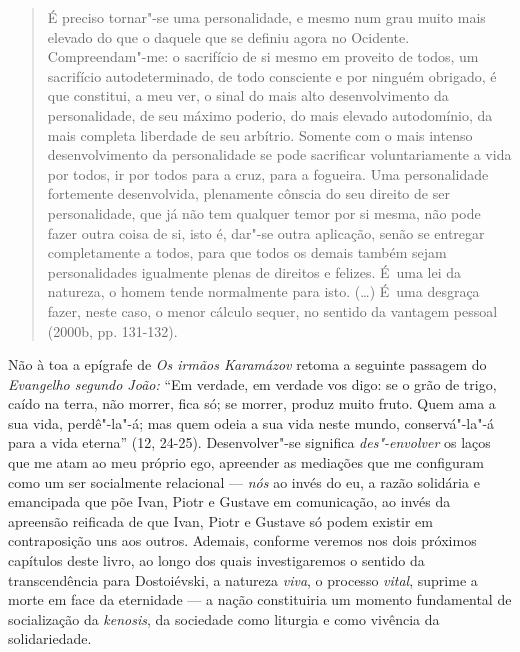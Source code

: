 \begin{quote}
É preciso tornar"-se uma personalidade, e mesmo num grau muito mais
elevado do que o daquele que se definiu agora no Ocidente.
Compreendam"-me: o sacrifício de si mesmo em proveito de todos, um
sacrifício autodeterminado, de todo consciente e por ninguém obrigado, é
que constitui, a meu ver, o sinal do mais alto desenvolvimento da
personalidade, de seu máximo poderio, do mais elevado autodomínio, da
mais completa liberdade de seu arbítrio. Somente com o mais intenso
desenvolvimento da personalidade se pode sacrificar voluntariamente a
vida por todos, ir por todos para a cruz, para a fogueira. Uma
personalidade fortemente desenvolvida, plenamente cônscia do seu direito
de ser personalidade, que já não tem qualquer temor por si mesma, não
pode fazer outra coisa de si, isto é, dar"-se outra aplicação, senão se
entregar completamente a todos, para que todos os demais também sejam
personalidades igualmente plenas de direitos e felizes. É~uma lei da
natureza, o homem tende normalmente para isto. (\ldots) É~uma desgraça
fazer, neste caso, o menor cálculo sequer, no sentido da vantagem
pessoal (2000b, pp. 131-132).
\end{quote}

Não à toa a epígrafe de \emph{Os irmãos Karamázov} retoma a seguinte
passagem do \emph{Evangelho segundo João:} ``Em verdade, em verdade vos
digo: se o grão de trigo, caído na terra, não morrer, fica só; se
morrer, produz muito fruto. Quem ama a sua vida, perdê"-la"-á; mas quem
odeia a sua vida neste mundo, conservá"-la"-á para a vida eterna'' (12,
24-25). Desenvolver"-se significa \emph{des"-envolver} os laços que me
atam ao meu próprio ego, apreender as mediações que me configuram como
um ser socialmente relacional --- \emph{nós} ao invés do eu, a razão
solidária e emancipada que põe Ivan, Piotr e Gustave em comunicação, ao
invés da apreensão reificada de que Ivan, Piotr e Gustave só podem
existir em contraposição uns aos outros. Ademais, conforme veremos nos
dois próximos capítulos deste livro, ao longo dos quais investigaremos o
sentido da transcendência para Dostoiévski, a natureza \emph{viva}, o
processo \emph{vital}, suprime a morte em face da eternidade --- a nação
constituiria um momento fundamental de socialização da \emph{kenosis},
da sociedade como liturgia e como vivência da solidariedade.

